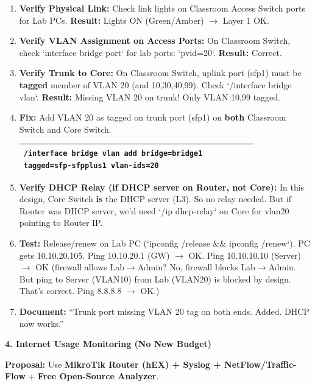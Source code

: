 \documentclass[11pt]{article}
\begin{document}
\begin{exoresolu}
\begin{enumerate}
\item \textbf{Verify Physical Link:} Check link lights on Classroom Access Switch ports for Lab PCs. \textbf{Result:} Lights ON (Green/Amber) $\rightarrow$ Layer 1 OK.
\item \textbf{Verify VLAN Assignment on Access Ports:} On Classroom Switch, check `interface bridge port` for lab ports: `pvid=20`. \textbf{Result:} Correct.
\item \textbf{Verify Trunk to Core:} On Classroom Switch, uplink port (sfp1) must be \textbf{tagged} member of VLAN 20 (and 10,30,40,99). Check `/interface bridge vlan`. \textbf{Result:} Missing VLAN 20 on trunk! Only VLAN 10,99 tagged.
\item \textbf{Fix:} Add VLAN 20 as tagged on trunk port (sfp1) on \textbf{both} Classroom Switch and Core Switch.
      \begin{center}
      \begin{tabular}{|p{0.8\linewidth}|}\hline
      \texttt{/interface bridge vlan add bridge=bridge1 tagged=sfp-sfpplus1 vlan-ids=20}\\\hline
      \end{tabular}
      \end{center}
\item \textbf{Verify DHCP Relay (if DHCP server on Router, not Core):} In this design, Core Switch \textbf{is} the DHCP server (L3). So no relay needed. But if Router was DHCP server, we'd need `/ip dhcp-relay` on Core for vlan20 pointing to Router IP.
\item \textbf{Test:} Release/renew on Lab PC (`ipconfig /release \&\& ipconfig /renew`). PC gets 10.10.20.105. Ping 10.10.20.1 (GW) $\rightarrow$ OK. Ping 10.10.10.10 (Server) $\rightarrow$ OK (firewall allows Lab$\rightarrow$Admin? No, firewall blocks Lab$\rightarrow$Admin. But ping to Server (VLAN10) from Lab (VLAN20) is blocked by design. That's correct. Ping 8.8.8.8 $\rightarrow$ OK.)
\item \textbf{Document:} ``Trunk port missing VLAN 20 tag on both ends. Added. DHCP now works.''
\end{enumerate}

\textbf{4. Internet Usage Monitoring (No New Budget)}

\textbf{Proposal:} Use \textbf{MikroTik Router (hEX) + Syslog + NetFlow/Traffic-Flow} + \textbf{Free Open-Source Analyzer}.


\end{exoresolu}
\end{document}
